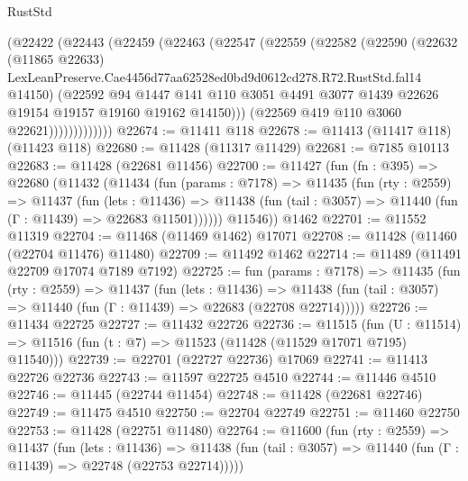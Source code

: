 \begin{lexlean}{RustStd}
\begin{coremodule}
                (@22422
                  (@22443
                    (@22459
                      (@22463
                        (@22547
                          (@22559
                            (@22582
                              (@22590
                                (@22632
                                  (@11865 @22633)
                                  LexLeanPreserve.Cae4456d77aa62528ed0bd9d0612cd278.R72.RustStd.fal14
                                  @14150)
                                (@22592
                                  @94
                                  @1447
                                  @141
                                  @110
                                  @3051
                                  @4491
                                  @3077
                                  @1439
                                  @22626
                                  @19154
                                  @19157
                                  @19160
                                  @19162
                                  @14150)))
                            (@22569 @419 @110 @3060 @22621)))))))))))))
@22674 := @11411 @118
@22678 := @11413 (@11417 @118) (@11423 @118)
@22680 := @11428 (@11317 @11429)
@22681 := @7185 @10113
@22683 := @11428 (@22681 @11456)
@22700 := @11427
    (fun (fn : @395) =>
    @22680
      (@11432
        (@11434
          (fun (params : @7178) =>
          @11435
            (fun (rty : @2559) =>
            @11437
              (fun (lets : @11436) =>
              @11438 (fun (tail : @3057) => @11440 (fun (Γ : @11439) => @22683 @11501))))))
        @11546))
    @1462
@22701 := @11552 @11319
@22704 := @11468 (@11469 @1462) @17071
@22708 := @11428 (@11460 (@22704 @11476) @11480)
@22709 := @11492 @1462
@22714 := @11489 (@11491 @22709 @17074 @7189 @7192)
@22725 := fun (params : @7178) =>
  @11435
    (fun (rty : @2559) =>
    @11437
      (fun (lets : @11436) =>
      @11438 (fun (tail : @3057) => @11440 (fun (Γ : @11439) => @22683 (@22708 @22714)))))
@22726 := @11434 @22725
@22727 := @11432 @22726
@22736 := @11515
    (fun (U : @11514) => @11516 (fun (t : @7) => @11523 (@11428 (@11529 @17071 @7195) @11540)))
@22739 := @22701 (@22727 @22736) @17069
@22741 := @11413 @22726 @22736
@22743 := @11597 @22725 @4510
@22744 := @11446 @4510
@22746 := @11445 (@22744 @11454)
@22748 := @11428 (@22681 @22746)
@22749 := @11475 @4510
@22750 := @22704 @22749
@22751 := @11460 @22750
@22753 := @11428 (@22751 @11480)
@22764 := @11600
    (fun (rty : @2559) =>
    @11437
      (fun (lets : @11436) =>
      @11438 (fun (tail : @3057) => @11440 (fun (Γ : @11439) => @22748 (@22753 @22714)))))

\end{coremodule}
\end{lexlean}
